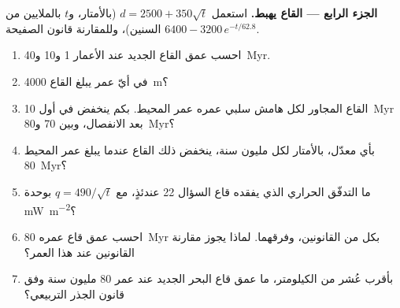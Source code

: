 \begin{problem}
\medskip
\noindent\textbf{الجزء الرابع --- القاع يهبط.} استعمل $d = 2500 + 350\sqrt t$ (بالأمتار، و$t$ بالملايين من السنين)، وللمقارنة قانون الصفيحة $6400 - 3200\,e^{-t/62.8}$.
\begin{enumerate}[resume]
  \item احسب عمق القاع الجديد عند الأعمار 1 و\num{10} و\qty{40}{Myr}.
  \item في أيّ عمر يبلغ القاع \qty{4000}{m}؟
  \item القاع المجاور لكل هامش سلبي عمره عمر المحيط. بكم ينخفض في أول \qty{10}{Myr} بعد الانفصال، وبين 70 و\qty{80}{Myr}؟
  \item بأي معدّل، بالأمتار لكل مليون سنة، ينخفض ذلك القاع عندما يبلغ عمر المحيط \qty{80}{Myr}؟
  \item ما التدفّق الحراري الذي يفقده قاع السؤال 22 عندئذٍ، مع $q = 490/\sqrt t$ بوحدة \unit{mW.m^{-2}}؟
  \item احسب عمق قاع عمره \qty{80}{Myr} بكل من القانونين، وفرقهما. لماذا يجوز مقارنة القانونين عند هذا العمر؟
  \item بأقرب عُشر من الكيلومتر، ما عمق قاع البحر الجديد عند عمر 80 مليون سنة وفق قانون الجذر التربيعي؟
\end{enumerate}
\end{problem}
